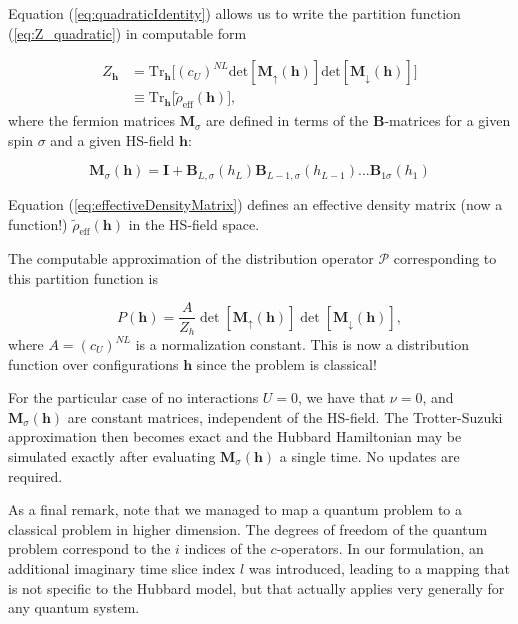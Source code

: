\documentclass[10pt, twocolumn, twoside]{article}
\begin{document}
Equation (\ref{eq:quadraticIdentity}) allows us to write the partition function (\ref{eq:Z_quadratic}) in computable form

\begin{equation}\label{eq:effectiveDensityMatrix}
\begin{split}
Z_{\bm h} &=  \text{Tr}_{\bm h} \bigg[ (c_U)^{NL} \text{det} [ \bm M_\uparrow (\bm h)] \text{det} [  \bm M_\downarrow (\bm h) ] \bigg] \\
&\equiv  \text{Tr}_{\bm h} \bigg[  \tilde{\rho}_{\text{eff}} (\bm h) \bigg] ,
\end{split}
\end{equation}
where the fermion matrices $\bm M_\sigma$ are defined in terms of the $\bm B$-matrices for a given spin $\sigma$ and a given HS-field $\bm h$:

\begin{equation}
\bm M_\sigma (\bm h) = \bm I + \bm B_{L,\sigma} ( h_L) \bm B_{L-1,\sigma} ( h_{L-1}) ... \bm B_{1\sigma} ( h_1)
\end{equation}

Equation (\ref{eq:effectiveDensityMatrix}) defines an effective density matrix (now a function!) $\tilde{\rho}_{\text{eff}} (\bm h)$ in the HS-field space.

The computable approximation of the distribution operator $\mathcal{P}$ corresponding to this partition function is

\begin{equation}
P(\bm h) = \frac{A}{Z_h} \det [ \bm M_{\uparrow}(\bm h) ] \det [ \bm M_{\downarrow}(\bm h) ] ,
\end{equation}
where $A = (c_U)^{NL}$ is a normalization constant. This is now a distribution function over configurations $\bm h$ since the problem is classical!

For the particular case of no interactions $U = 0$, we have that $\nu = 0$, and $\bm M_\sigma (\bm h)$ are constant matrices, independent of the HS-field. The Trotter-Suzuki approximation then becomes exact and the Hubbard Hamiltonian may be simulated exactly after evaluating $\bm M_\sigma (\bm h)$ a single time. No updates are required.

As a final remark, note that we managed to map a quantum problem to a classical problem in higher dimension. The degrees of freedom of the quantum problem correspond to the $i$ indices  of the $c$-operators. In our formulation, an additional imaginary time slice index $l$ was introduced, leading to a mapping that is not specific to the Hubbard model, but that actually applies very generally for any quantum system.
\end{document}
